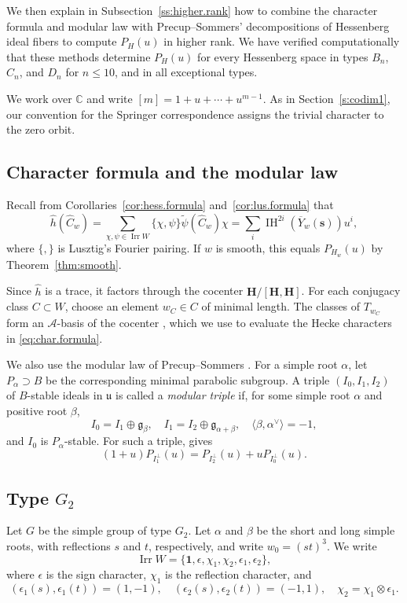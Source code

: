 \documentclass[11pt]{amsart}
\numberwithin{equation}{section}
\theoremstyle{definition}
\newcommand\hecke{\mathbf{H}}  %
\def\beq{\begin{equation}}
\def\eeq{\end{equation}}
\DeclareMathOperator{\Irr}{\mathrm{Irr}}
\def\cA{\mathcal {A}}
\def\C{\mathbb{C}}
\DeclareMathOperator{\IH}{\mathrm{IH}}
\begin{document}
We then explain in Subsection~\ref{ss:higher.rank} how to combine the character formula and modular law with Precup--Sommers' decompositions of Hessenberg ideal fibers to compute $P_H(u)$ in higher rank.
We have verified computationally that these methods determine $P_H(u)$ for every Hessenberg space in types $B_n$, $C_n$, and $D_n$ for $n\leq10$, and in all exceptional types.

We work over $\C$ and write $[m]=1+u+\cdots+u^{m-1}$.
As in Section~\ref{s:codim1}, our convention for the Springer correspondence assigns the trivial character to the zero orbit.

\subsection{Character formula and the modular law}
Recall from Corollaries~\ref{cor:hess.formula} and~\ref{cor:lus.formula} that
\beq\label{eq:char.formula}
\widehat h(\widehat C_w)
=\sum_{\chi,\psi\in\Irr W}\{\chi,\psi\} \widetilde\psi(\widehat C_w)\chi
=\sum_i\IH^{2i}(\overline Y_w(\mathbf s))u^i,
\eeq
where $\{ , \}$ is Lusztig's Fourier pairing.
If $w$ is smooth, this equals $P_{H_w}(u)$ by Theorem~\ref{thm:smooth}.


Since $\widehat h$ is a trace, it factors through the cocenter $\hecke/[\hecke,\hecke]$.
For each conjugacy class $C\subset W$, choose an element $w_C\in C$ of minimal length.
The classes of $T_{w_C}$ form an $\cA$-basis of the cocenter \cite[Theorem~8.2.3]{GP}, which we use to evaluate the Hecke characters in \eqref{eq:char.formula}.

We also use the modular law of Precup--Sommers \cite{PS}.
For a simple root $\alpha$, let $P_\alpha\supset B$ be the corresponding minimal parabolic subgroup.
A triple $(I_0,I_1,I_2)$ of $B$-stable ideals in $\mathfrak u$ is called a \emph{modular triple} if, for some simple root $\alpha$ and positive root $\beta$,
\[
I_0=I_1\oplus\mathfrak g_\beta,\quad
I_1=I_2\oplus\mathfrak g_{\alpha+\beta},\quad
\langle\beta,\alpha^\vee\rangle=-1,
\]
and $I_0$ is $P_\alpha$-stable.
For such a triple, \cite[Proposition~6.5]{PS} gives
\beq\label{eq:modular.law}
(1+u)P_{I_1^\perp}(u)=P_{I_2^\perp}(u)+uP_{I_0^\perp}(u).
\eeq


\subsection{Type \texorpdfstring{$G_2$}{G2}}\label{ss:G2.characters}
Let $G$ be the simple group of type $G_2$.
Let $\alpha$ and $\beta$ be the short and long simple roots, with reflections $s$ and $t$, respectively, and write $w_0=(st)^3$.
We write
\[
\Irr W=\{\mathbf1,\epsilon,\chi_1,\chi_2,\epsilon_1,\epsilon_2\},
\]
where $\epsilon$ is the sign character, $\chi_1$ is the reflection character, and
\[
(\epsilon_1(s),\epsilon_1(t))=(1,-1),\quad
(\epsilon_2(s),\epsilon_2(t))=(-1,1),\quad
\chi_2=\chi_1\otimes\epsilon_1.
\]
\end{document}
